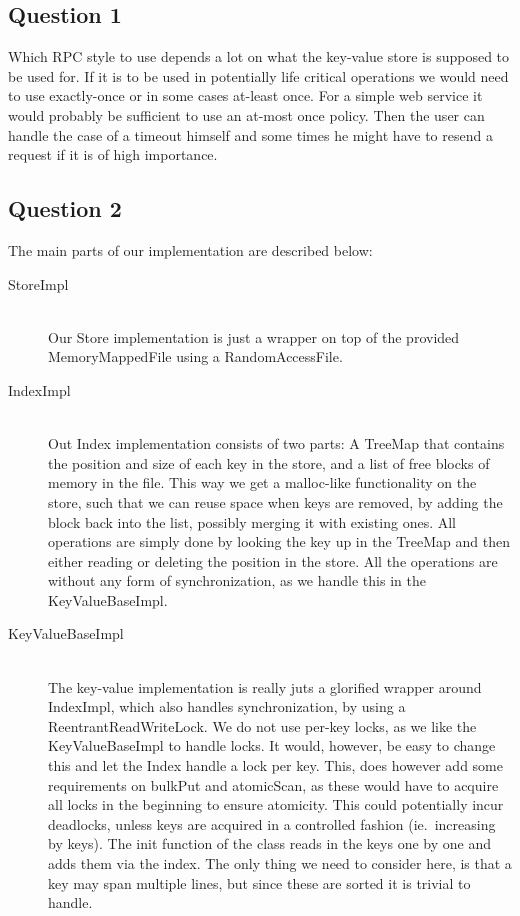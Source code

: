 \documentclass[a4paper,final]{article}
\newcommand{\mono}[1]{{\ttfamily#1}}
\begin{document}
\subsection*{Question 1}
Which RPC style to use depends a lot on what the key-value store is supposed
to be used for. If it is to be used in potentially life critical operations
we would need to use exactly-once or in some cases at-least once. For a simple
web service it would probably be sufficient to use an at-most once policy.
Then the user can handle the case of a timeout himself and some times he might
have to resend a request if it is of high importance.

\subsection*{Question 2}
The main parts of our implementation are described below:

\begin{description}
    \item [\mono{StoreImpl}]\ \\
        Our Store implementation is just a wrapper on top of the provided
        \mono{MemoryMappedFile} using a \mono{RandomAccessFile}.
    \item [\mono{IndexImpl}]\ \\
        Out Index implementation consists of two parts: A \mono{TreeMap} that
        contains the position and size of each key in the store, and a list
        of free blocks of memory in the file. This way we get a
        \mono{malloc}-like functionality on the store, such that we can reuse
        space when keys are removed, by adding the block back into the list,
        possibly merging it with existing ones. All operations are simply done
        by looking the key up in the \mono{TreeMap} and then either reading or
        deleting the position in the store. All the operations are without any
        form of synchronization, as we handle this in the
        \mono{KeyValueBaseImpl}.
    \item [\mono{KeyValueBaseImpl}]\ \\
        The key-value implementation is really juts a glorified wrapper around
        \mono{IndexImpl}, which also handles synchronization, by using a
        \linebreak
        \mono{ReentrantReadWriteLock}. We do not use per-key locks, as we like
        the \mono{KeyValueBaseImpl} to handle locks. It would, however, be easy
        to change this and let the Index handle a lock per key. This, does
        however add some requirements on \mono{bulkPut} and \mono{atomicScan},
        as these would have to acquire all locks in the beginning to ensure
        atomicity. This could potentially incur deadlocks, unless keys are
        acquired in a controlled fashion (ie.~increasing by keys).
        The \mono{init} function of the class reads in the keys one by one
        and adds them via the index. The only thing we need to consider here,
        is that a key may span multiple lines, but since these are sorted it
        is trivial to handle.
\end{description}
\end{document}
